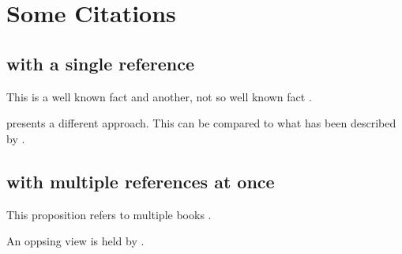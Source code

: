 \documentclass[onesided,12pt,a4paper]{scrreprt}
\begin{document}
\chapter{Some Citations}

\section{with a single reference}

This is a well known fact \parencite[p.\,5]{basseler2002} and another, not so well known fact \parencite[see][p.\,7]{samuelson1998}.

\Textcite{schumann1999} presents a different approach. This can be compared to what has been described by \textcite[pp.\,26]{felderer2003}.


\section{with multiple references at once}

This proposition refers to multiple books \parencite{blanchard2004,siebert2003}.

An oppsing view is held by \textcite{trossmann1991,mankiw2003}.


\printbibliography
\end{document}
